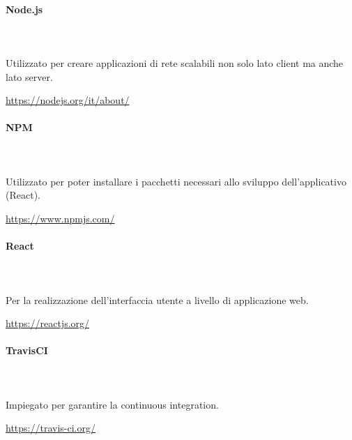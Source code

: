 	\paragraph{Node.js}\mbox{} \\ \mbox{} \\
	Utilizzato per creare applicazioni di rete scalabili non solo lato client ma anche lato server.
	\\
	\centerline{\url{https://nodejs.org/it/about/}}
	\paragraph{NPM}\mbox{} \\ \mbox{} \\
	Utilizzato per poter installare i pacchetti necessari allo sviluppo dell’applicativo (React\glo).
	\\
	\centerline{\url{https://www.npmjs.com/}}
	\paragraph{React}\mbox{} \\ \mbox{} \\
	Per la realizzazione dell’interfaccia utente a livello di applicazione web.\\
	\centerline{\url{https://reactjs.org/}}
	\paragraph{TravisCI}\mbox{} \\ \mbox{} \\
	Impiegato per garantire la continuous integration.
	\\
	\centerline{\url{https://travis-ci.org/}}